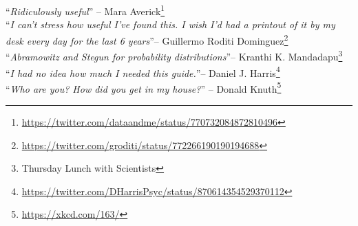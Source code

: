 \normalstretch
\newpage ~\newpage

~\\

\noindent
``\emph{Ridiculously useful}'' -- Mara Averick\footnote{\url{https://twitter.com/dataandme/status/770732084872810496}}
\\

\noindent
``\emph{I can't stress how useful I've found this. I wish I'd had a printout of it by my desk every day for the last 6 years}''-- Guillermo Roditi Dominguez\footnote{\url{https://twitter.com/groditi/status/772266190190194688}}
\\

\noindent
``\emph{Abramowitz and Stegun for probability distributions}''-- Kranthi K. Mandadapu\footnote{Thursday Lunch with Scientists}
\\

\noindent
``\emph{I had no idea how much I needed this guide.}''-- Daniel J. Harris\footnote{\url{https://twitter.com/DHarrisPsyc/status/870614354529370112}}
\\



\noindent
``\emph{Who are you? How did you get in my house?}'' -- Donald Knuth\footnote{\url{https://xkcd.com/163/}}
\\

